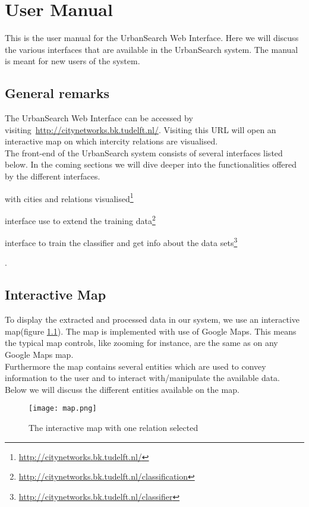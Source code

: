 \chapter{User Manual}
This is the user manual for the UrbanSearch Web Interface. Here we will discuss the various interfaces that are available in the UrbanSearch system. The manual is meant for new users of the system.

\section{General remarks}
The UrbanSearch Web Interface can be accessed by visiting~\url{http://citynetworks.bk.tudelft.nl/}. Visiting this URL will open an interactive map on which intercity relations are visualised.\\
The front-end of the UrbanSearch system consists of several interfaces listed below. In the coming sections we will dive deeper into the functionalities offered by the different interfaces.

\begin{description}[align=left]
\item [Interactive Map] with cities and relations visualised\footnote{\url{http://citynetworks.bk.tudelft.nl/}}
\item [Classification] interface use to extend the training data\footnote{\url{http://citynetworks.bk.tudelft.nl/classification}}
\item [Classifier] interface to train the classifier and get info about the data sets\footnote{\url{http://citynetworks.bk.tudelft.nl/classifier}}
\end{description}. 


\section{Interactive Map}

To display the extracted and processed data in our system, we use an interactive map(figure \ref{fig:map}). The map is implemented with use of Google Maps. This means the typical map controls, like zooming for instance, are the same as on any Google Maps map.\\
Furthermore the map contains several entities which are used to convey information to the user and to interact with/manipulate the available data.\\
Below we will discuss the different entities available on the map.
\begin{figure}[H]
    \centering
    \texttt{[image: map.png]}
    \caption{The interactive map with one relation selected}
    \label{fig:map}
\end{figure}

